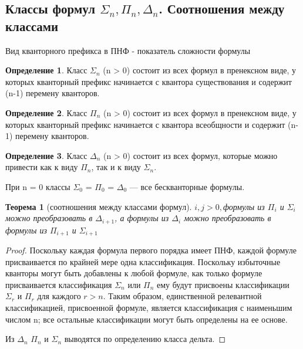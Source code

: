 \documentclass[a4paper]{article}
\newtheorem{theorem}{Теорема}[section]
\theoremstyle{definition}
\newtheorem*{definition}{Определение}
\theoremstyle{remark}
\begin{document}
    \subsection{Классы формул $\Sigma_n, \Pi_n, \Delta_n$. Соотношения между классами}
    Вид кванторного префикса в ПНФ -  показатель сложности формулы
    \begin{definition}
        Класс $\Sigma_n$ (n > 0) состоит из всех формул в пренексном виде, у которых кванторный префикс 
        начинается с квантора существования и содержит (n-1) перемену кванторов.
    \end{definition}
    \begin{definition}
        Класс $\Pi_n$ (n > 0) состоит из всех формул в пренексном виде, у которых кванторный префикс 
    начинается с квантора всеобщности и содержит (n-1) перемену кванторов.
    \end{definition}
    \begin{definition}
        Класс $\Delta_n$ (n > 0) состоит из всех формул, которые можно привести как к виду $\Pi_n$, 
        так и к виду $\Sigma_n$.
    \end{definition}
    
    При n = 0 классы $\Sigma_0$ = $\Pi_0$ = $\Delta_0$ — все бескванторные формулы.

    \begin{theorem}[соотношения между классами формул]
        $i, j > 0,$формулы из $\Pi_i$ и $\Sigma_i$ можно преобразовать в $\Delta_{i+1}$, а
        формулы из $\Delta_{i}$ можно преобразовать в формулы из $\Pi_{i+1}$ и $\Sigma_{i+1}$
    \end{theorem}
    \begin{proof}
        Поскольку каждая формула первого порядка имеет ПНФ, 
        каждой формуле присваивается по крайней мере одна классификация. 
        Поскольку избыточные кванторы могут быть добавлены к любой формуле, как только 
        формуле присваивается классификация ${ \Sigma _{n}}$ 
        или ${ \Pi _{n}}$ ему будут присвоены классификации 
        ${ \Sigma _{r}}$ и ${ \Pi _{r}}$ для каждого $r > n$. 
        Таким образом, единственной релевантной классификацией, присвоенной формуле, 
        является классификация с наименьшим числом n; все остальные 
        классификации могут быть определены на ее основе.

        Из $\Delta_n$ $\Pi_n$ и $\Sigma_n$ выводятся по определению класса дельта.
    \end{proof}
\end{document}
